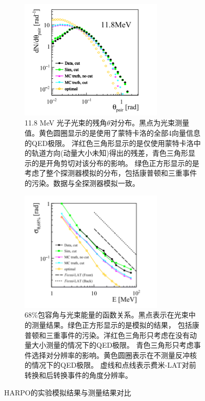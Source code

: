 \begin{figure}[htbp]
	\centering
	\begin{subfigure}[b]{0.45\textwidth}
		\includegraphics[width=0.75\textwidth]{figures/探测器模拟结果.png}
		\caption{11.8 MeV 光子光束的残角$\theta$对分布。黑点为光束测量值。黄色圆圈显示的是使用了蒙特卡洛的全部4向量信息的QED极限。
		洋红色三角形显示的是仅使用蒙特卡洛中的轨道方向(动量大小未知)得出的残差，青色三角形显示的是开角剪切对该分布的影响。
		绿色正方形显示的是考虑了整个探测器模拟的分布，包括康普顿和三重事件的污染。数据与全探测器模拟一致。}
		\label{fig:sub3}
	\end{subfigure}
	\hspace{0.01\textwidth} %
	\begin{subfigure}[b]{0.45\textwidth}
		\includegraphics[width=0.75\textwidth]{figures/角分辨率与能量关系.png}
		\caption{68\%包容角与光束能量的函数关系。黑点表示在光束中的测量结果。绿色正方形显示的是模拟的结果，
		包括康普顿和三重事件的污染。洋红色三角形只考虑在没有动量大小测量的情况下的QED极限。
		青色三角形只考虑事件选择对分辨率的影响。黄色圆圈表示在不测量反冲核的情况下的QED极限。
		虚线和点线表示费米-LAT对前转换和后转换事件的角度分辨率。}
		\label{fig:sub4}
	\end{subfigure}
	\caption{HARPO的实验模拟结果与测量结果对比}
	\label{fig:figures2}
\end{figure}


